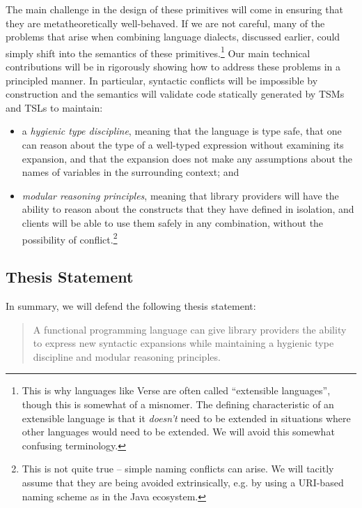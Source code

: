 The main challenge in the design of these primitives will come in ensuring that they are metatheoretically well-behaved. If we are not careful, many of the problems  that arise when combining language dialects, discussed earlier, could simply shift into the semantics of these primitives.\footnote{This is why languages  like Verse are often called ``extensible languages'', though this is somewhat of a misnomer. The defining characteristic of an extensible language is that it \emph{doesn't} need to be extended in situations where other languages would need to be extended. We will avoid this somewhat confusing terminology.} Our main technical contributions will be in rigorously showing how to address these problems in a principled manner. In particular, syntactic conflicts will be impossible by construction and the semantics will validate code statically generated by TSMs and TSLs to maintain:
\begin{itemize}
\item a \emph{hygienic type discipline}, meaning that the language is type safe, that one can reason about the type of a well-typed expression without examining its expansion, and that the expansion does not make any assumptions about the names of variables in the surrounding context; and
\item \emph{modular reasoning principles}, meaning that library providers will have the ability to reason about the constructs that they have defined in isolation, and clients will be able to use them safely in any combination, without the possibility of conflict.\footnote{This is not quite true -- simple naming conflicts can arise. We will tacitly assume that they are being avoided extrinsically, e.g. by using a URI-based naming scheme as in the Java ecosystem.} 
\end{itemize}

\subsection*{Thesis Statement}
In summary, we will defend the following thesis statement:

\begin{quote}
A functional programming language can give library providers the ability to %
express new syntactic expansions while maintaining a hygienic type discipline and modular reasoning principles. %
\end{quote}
